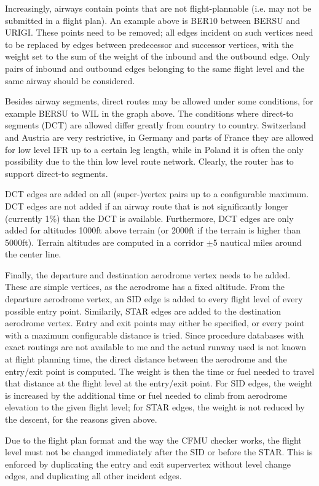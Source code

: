 \documentclass[a4paper,10pt,pdftex]{article}
\begin{document}
Increasingly, airways contain points that are not flight-plannable
(i.e. may not be submitted in a flight plan). An example above is
BER10 between BERSU and URIGI. These points need to be removed; all
edges incident on such vertices need to be replaced by edges between
predecessor and successor vertices, with the weight set to the sum
of the weight of the inbound and the outbound edge. Only pairs of
inbound and outbound edges belonging to the same flight level and the
same airway should be considered.

Besides airway segments, direct routes may be allowed under some
conditions, for example BERSU to WIL in the graph above. The
conditions where direct-to segments (DCT) are allowed differ greatly
from country to country. Switzerland and Austria are very restrictive,
in Germany and parts of France they are allowed for low level IFR up
to a certain leg length, while in Poland it is often the only
possibility due to the thin low level route network. Clearly, the
router has to support direct-to segments.

DCT edges are added on all (super-)vertex pairs up to a configurable
maximum. DCT edges are not added if an airway route that is not
significantly longer (currently 1\%) than the DCT is
available. Furthermore, DCT edges are only added for altitudes 1000ft
above terrain (or 2000ft if the terrain is higher than
5000ft). Terrain altitudes are computed in a corridor $\pm$5 nautical
miles around the center line.

Finally, the departure and destination aerodrome vertex needs to be
added. These are simple vertices, as the aerodrome has a fixed
altitude. From the departure aerodrome vertex, an SID edge is added to
every flight level of every possible entry point. Similarily, STAR
edges are added to the destination aerodrome vertex. Entry and exit
points may either be specified, or every point with a maximum
configurable distance is tried. Since procedure databases with exact
routings are not available to me and the actual runway used is not
known at flight planning time, the direct distance between the
aerodrome and the entry/exit point is computed. The weight is then the
time or fuel needed to travel that distance at the flight level at the
entry/exit point. For SID edges, the weight is increased by the
additional time or fuel needed to climb from aerodrome elevation to
the given flight level; for STAR edges, the weight is not reduced by
the descent, for the reasons given above.

Due to the flight plan format and the way the CFMU checker works, the
flight level must not be changed immediately after the SID or before
the STAR. This is enforced by duplicating the entry and exit
supervertex without level change edges, and duplicating all other
incident edges.
\end{document}
